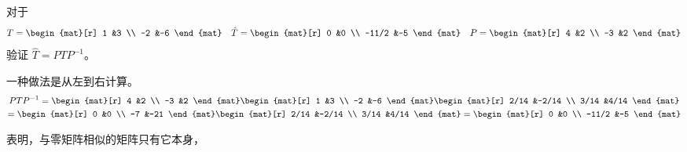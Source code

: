 \begin{exercises}
  \item 
    对于
    \begin{equation*}
      T=
      \begin{mat}[r]
        1  &3  \\
       -2  &-6
      \end{mat}
      \quad
      \hat{T}=
      \begin{mat}[r]
        0    &0  \\
       -11/2 &-5
      \end{mat}
      \quad
      P=
      \begin{mat}[r]
        4  &2  \\
       -3  &2
      \end{mat}
    \end{equation*}
    验证 $\hat{T}=PTP^{-1}$。
    \begin{answer}
      一种做法是从左到右计算。
      \begin{multline*}
        PTP^{-1}=
        \begin{mat}[r]
          4  &2  \\
         -3  &2
        \end{mat}
        \begin{mat}[r]
          1  &3  \\
         -2  &-6
        \end{mat}
        \begin{mat}[r]
          2/14  &-2/14  \\
          3/14  &4/14
        \end{mat}                                 \\
        =
        \begin{mat}[r]
          0  &0  \\
         -7  &-21
        \end{mat}  
        \begin{mat}[r]
          2/14  &-2/14  \\
          3/14  &4/14
        \end{mat}
        =
        \begin{mat}[r]
          0    &0  \\
         -11/2 &-5
        \end{mat}
      \end{multline*}
    \end{answer}
  \item
     表明，与零矩阵相似的矩阵只有它本身，

\end{exercises}
